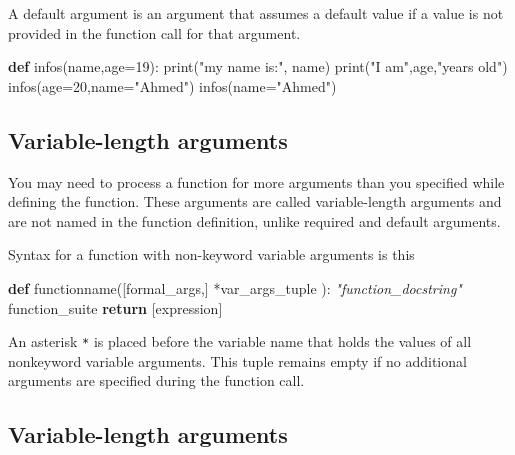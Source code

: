 \documentclass[11pt]{article}
\newenvironment{Shaded}{}{}
\newcommand{\KeywordTok}[1]{\textcolor[rgb]{0.00,0.44,0.13}{\textbf{{#1}}}}
\newcommand{\DecValTok}[1]{\textcolor[rgb]{0.25,0.63,0.44}{{#1}}}
\newcommand{\StringTok}[1]{\textcolor[rgb]{0.25,0.44,0.63}{{#1}}}
\newcommand{\CommentTok}[1]{\textcolor[rgb]{0.38,0.63,0.69}{\textit{{#1}}}}
\newcommand{\NormalTok}[1]{{#1}}
\newcommand{\ControlFlowTok}[1]{\textcolor[rgb]{0.00,0.44,0.13}{\textbf{{#1}}}}
\newcommand{\OperatorTok}[1]{\textcolor[rgb]{0.40,0.40,0.40}{{#1}}}
\newcommand{\BuiltInTok}[1]{{#1}}
\begin{document}
A default argument is an argument that assumes a default value if a
value is not provided in the function call for that argument.

\begin{Shaded}
\begin{Highlighting}[]
\KeywordTok{def}\NormalTok{ infos(name,age}\OperatorTok{=}\DecValTok{19}\NormalTok{):}
        \BuiltInTok{print}\NormalTok{(}\StringTok{"my name is:"}\NormalTok{, name)}
        \BuiltInTok{print}\NormalTok{(}\StringTok{"I am"}\NormalTok{,age,}\StringTok{"years old"}\NormalTok{)}
\NormalTok{    infos(age}\OperatorTok{=}\DecValTok{20}\NormalTok{,name}\OperatorTok{=}\StringTok{"Ahmed"}\NormalTok{)}
\NormalTok{    infos(name}\OperatorTok{=}\StringTok{"Ahmed"}\NormalTok{)}
\end{Highlighting}
\end{Shaded}

\hypertarget{variable-length-arguments}{%
\subsection{Variable-length arguments}\label{variable-length-arguments}}

You may need to process a function for more arguments than you specified
while defining the function. These arguments are called variable-length
arguments and are not named in the function definition, unlike required
and default arguments.

Syntax for a function with non-keyword variable arguments is this

\begin{Shaded}
\begin{Highlighting}[]
\KeywordTok{def}\NormalTok{ functionname([formal\_args,] }\OperatorTok{*}\NormalTok{var\_args\_tuple ):}
    \CommentTok{"function\_docstring"}
\NormalTok{    function\_suite}
    \ControlFlowTok{return}\NormalTok{ [expression]}
\end{Highlighting}
\end{Shaded}

An asterisk \texttt{*} is placed before the variable name that holds the
values of all nonkeyword variable arguments. This tuple remains empty if
no additional arguments are specified during the function call.

\hypertarget{variable-length-arguments-1}{%
\subsection{Variable-length
arguments}\label{variable-length-arguments-1}}
\end{document}
